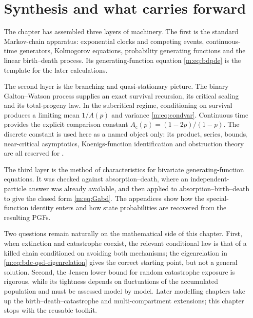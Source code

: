 \section{Synthesis and what carries forward}\label{m:sec:summary}

The chapter has assembled three layers of machinery.  The first is the standard
Markov-chain apparatus: exponential clocks and competing events, continuous-time
generators, Kolmogorov equations, probability generating functions and the linear
birth--death process.  Its generating-function equation
\cref{m:eq:bdpde} is the template for the later calculations.

The second layer is the branching and quasi-stationary picture.  The binary
Galton--Watson process supplies an exact survival recursion, its critical scaling
and its total-progeny law.  In the subcritical regime, conditioning on survival
produces a limiting mean \(1/A(p)\) and variance \cref{m:eq:condvar}.  Continuous
time provides the explicit comparison constant
\(A_{\mathrm c}(p)=(1-2p)/(1-p)\).  The discrete constant is used here as a named
object only: its product, series, bounds, near-critical asymptotics,
Koenigs-function identification and obstruction theory are all reserved for
\ChA.

The third layer is the method of characteristics for bivariate generating-function
equations.  It was checked against absorption--death, where an independent-particle
answer was already available, and then applied to absorption--birth--death to give
the closed form \cref{m:eq:Gabd}.  The appendices show how the special-function
identity enters and how state probabilities are recovered from the resulting PGFs.

Two questions remain naturally on the mathematical side of this chapter.  First,
when extinction and catastrophe coexist, the relevant conditional law is that of a
killed chain conditioned on avoiding both mechanisms; the eigenrelation in
\cref{m:eq:bdc-qsd-eigenrelation} gives the correct starting point, but not a
general solution.  Second, the Jensen lower bound for random catastrophe exposure
is rigorous, while its tightness depends on fluctuations of the accumulated
population and must be assessed model by model.  Later modelling chapters take up
the birth--death--catastrophe and multi-compartment extensions; this chapter stops
with the reusable toolkit.

